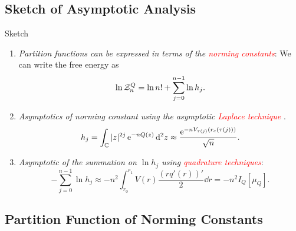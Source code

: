 \subsection{Sketch of Asymptotic Analysis}

\begin{frame}{Sketch}
	\begin{enumerate}
		\item \textit{Partition functions can be expressed in terms of the \textcolor{red}{norming constants}}:  We can write the free energy as
		\begin{equation*}
			\ln \mathcal{Z}_{n}^{Q} = \ln{n!} + \sum_{j=0}^{n-1} \ln{h_j}.
		\end{equation*} \pause
		\item \textit{Asymptotics of norming constant using the asymptotic \textcolor{red}{Laplace technique}} .
		\begin{equation*}
			h_j = \int_{\mathbb{C}} |z|^{2j} \operatorname{e}^{-n Q(z)} \dd^2 z \approx \frac{\operatorname{e}^{-n V_{\tau(j)}(r_c(\tau(j)))}}{\sqrt{n}}.
		\end{equation*} \pause
		\item \textit{Asymptotic of the summation on $\ln h_j$ using \textcolor{red}{quadrature techniques}}: 
		\begin{equation*}
			- \sum_{j=0}^{n-1} \ln{h_j} \approx - n^2 \int_{r_0}^{r_1} V(r) \frac{(r q'(r))'}{2} \dd r = - n^2 I_Q[\mu_Q].
		\end{equation*}
	\end{enumerate}
\end{frame}

\subsection{Partition Function of Norming Constants}

